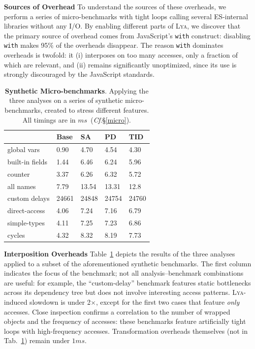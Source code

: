 \documentclass[letterpaper,twocolumn,10pt]{article}
\newcommand{\heading}[1]{\vspace{2pt}\noindent\textbf{#1}\enspace}
\newcommand{\ttt}[1]{\texttt{#1}}
\newcommand{\cf}[1]{(\emph{Cf}.\S\ref{#1})}
\newcommand{\sys}{{\scshape Lya}\xspace}
\begin{document}
\heading{Sources of Overhead}
To understand the sources of these overheads, we perform a series of micro-benchmarks with tight loops calling several ES-internal libraries without any I/O.
By enabling different parts of \sys, we discover that the primary source of overhead comes from JavaScript's \ttt{with} construct:
  disabling \ttt{with} makes 95\% of the overheads disappear.
The reason \ttt{with} dominates overheads is twofold: it (i) interposes on too many accesses, only a fraction of which are relevant, and (ii) remains significantly unoptimized, since its use is strongly discouraged by the JavaScript standards.


\begin{table}[t]
\center
\footnotesize
\setlength\tabcolsep{3pt}
\caption{
  \footnotesize{
    \textbf{Synthetic Micro-benchmarks}.
		Applying the three analyses on a series of synthetic micro-benchmarks, created to stress different features.
    All timings are in $ms$~\cf{micro}.
  }
}
\begin{tabular*}{\columnwidth}{l @{\extracolsep{\fill}} lll l}
\toprule
	               &   Base    &  SA     & PD      &  TID    \\
\midrule
global  vars     &   0.90    &  4.70   &  4.54   &  4.30   \\
built-in fields  &   1.44    &  6.46   &  6.24   &  5.96   \\
counter          &   3.37    &  6.26   &  6.32   &  5.72   \\
all names        &   7.79    &  13.54  &  13.31  &  12.8   \\
custom delays    &   24661   &  24848  &  24754  &  24760  \\
direct-access    &   4.06    &  7.24   &  7.16   &  6.79   \\
simple-types     &   4.11    &  7.25   &  7.23   &  6.86   \\
cycles           &   4.32    &  8.32   &  8.19   &  7.73   \\
\bottomrule
\end{tabular*}
\label{tab:synthetic}
\vspace{-5mm}
\end{table}


\heading{Interposition Overheads}
Table~\ref{tab:synthetic} depicts the results of the three analyses applied to a subset of the aforementioned synthetic benchmarks.
The first column indicates the focus of the benchmark; not all analysis--benchmark combinations are useful:
  for example, the ``custom-delay'' benchmark features static bottlenecks across its dependency tree but does not involve interesting access patterns.
\sys-induced slowdown is under 2$\times$, except for the first two cases that feature \emph{only} accesses.
Close inspection confirms a correlation to the number of wrapped objects and the frequency of accesses:
  these benchmarks feature artificially tight loops with high-frequency accesses.
Transformation overheads themselves (not in Tab.~\ref{tab:synthetic}) remain under $1ms$.
\end{document}
